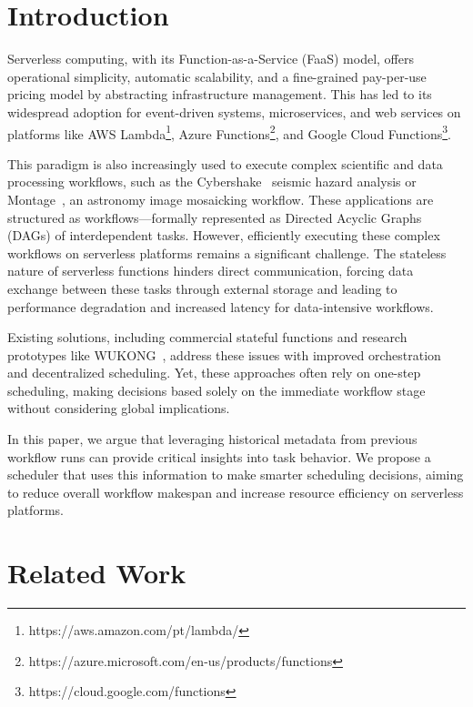 \documentclass[conference]{IEEEtran}
\begin{document}
\section{Introduction}

Serverless computing, with its Function-as-a-Service (FaaS) model, offers operational simplicity, automatic scalability, and a fine-grained pay-per-use pricing model by abstracting infrastructure management. This has led to its widespread adoption for event-driven systems, microservices, and web services on platforms like AWS Lambda\footnote{https://aws.amazon.com/pt/lambda/}, Azure Functions\footnote{https://azure.microsoft.com/en-us/products/functions}, and Google Cloud Functions\footnote{https://cloud.google.com/functions}.

This paradigm is also increasingly used to execute complex scientific and data processing workflows, such as the Cybershake~\cite{cybershake_workflow} seismic hazard analysis or Montage~\cite{montage_astronomy}, an astronomy image mosaicking workflow. These applications are structured as workflows—formally represented as Directed Acyclic Graphs (DAGs) of interdependent tasks. However, efficiently executing these complex workflows on serverless platforms remains a significant challenge. The stateless nature of serverless functions hinders direct communication, forcing data exchange between these tasks through external storage and leading to performance degradation and increased latency for data-intensive workflows.

Existing solutions, including commercial stateful functions and research prototypes like WUKONG~\cite{wukong_2}, address these issues with improved orchestration and decentralized scheduling. Yet, these approaches often rely on one-step scheduling, making decisions based solely on the immediate workflow stage without considering global implications.

In this paper, we argue that leveraging historical metadata from previous workflow runs can provide critical insights into task behavior. We propose a scheduler that uses this information to make smarter scheduling decisions, aiming to reduce overall workflow makespan and increase resource efficiency on serverless platforms.


\section{Related Work}
\label{s:related_work}
\end{document}
